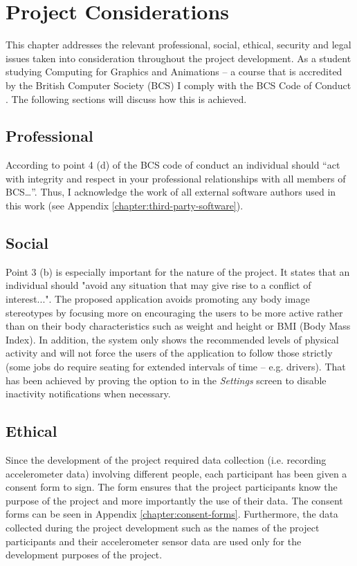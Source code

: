 \chapter{Project Considerations}
\label{chapter:project-considerations}
This chapter addresses the relevant professional, social, ethical, security and legal issues taken into consideration throughout the project development. As a student studying Computing for Graphics and Animations – a course that is accredited by the British Computer Society (BCS) I comply with the BCS Code of Conduct \citep{bcs_2017}. The following sections will discuss how this is achieved.
    
    \section{Professional}
    According to point 4 (d) of the BCS code of conduct an individual should “act with integrity and respect in your professional relationships with all members of BCS…”. Thus, I acknowledge the work of all external software authors used in this work (see Appendix \ref{chapter:third-party-software}).

    \section{Social}
    Point 3 (b) is especially important for the nature of the project. It states that an individual should "avoid any situation that may give rise to a conflict of interest...". The proposed application avoids promoting any body image stereotypes by focusing more on encouraging the users to be more active rather than on their body characteristics such as weight and height or BMI (Body Mass Index). In addition, the system only shows the recommended levels of physical activity and will not force the users of the application to follow those strictly (some jobs do require seating for extended intervals of time – e.g. drivers). That has been achieved by proving the option to in the \textit{Settings} screen to disable inactivity notifications when necessary.
    
    \section{Ethical}
    Since the development of the project required data collection (i.e. recording accelerometer data) involving different people, each participant has been given a consent form to sign. The form ensures that the project participants know the purpose of the project and more importantly the use of their data. The consent forms can be seen in Appendix \ref{chapter:consent-forms}. Furthermore, the data collected during the project development such as the names of the project participants and their accelerometer sensor data are used only for the development purposes of the project. 
    
